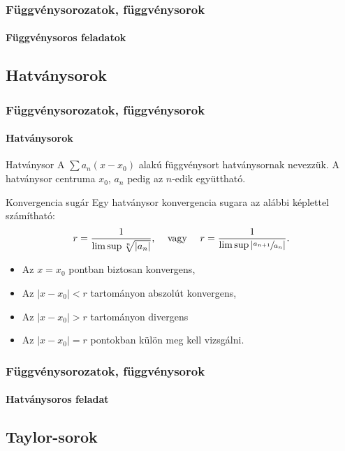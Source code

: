 \begin{frame}
  \frametitle{Függvénysorozatok, függvénysorok}
  \framesubtitle{Függvénysoros feladatok}

  
\end{frame}

\subsection{Hatványsorok}

\begin{frame}
  \frametitle{Függvénysorozatok, függvénysorok}
  \framesubtitle{Hatványsorok}

  \begin{block}{Hatványsor}
    A $\sum a_n (x - x_0)$ alakú függvénysort hatványsornak nevezzük.
    A hatványsor centruma $x_0$, $a_n$ pedig az $n$-edik együttható.
  \end{block}

  \begin{block}{Konvergencia sugár}
    Egy hatványsor konvergencia sugara az alábbi képlettel számítható:
    \[
      r = \frac{1}{\limsup \sqrt[n]{|a_n|}}
      \text,
      \quad
      \text{ vagy }
      \quad
      r = \frac{1}{\limsup{|\sfrac{a_{n+1}}{a_n}|} }
      \text.
    \]
    \begin{itemize}
      \item Az $x = x_0$ pontban biztosan konvergens,
      \item Az $|x - x_0| < r$ tartományon abszolút konvergens,
      \item Az $|x - x_0| > r$ tartományon divergens
      \item Az $|x - x_0| = r$ pontokban külön meg kell vizsgálni.
    \end{itemize}
  \end{block}
\end{frame}

\begin{frame}
  \frametitle{Függvénysorozatok, függvénysorok}
  \framesubtitle{Hatványsoros feladat}

  
\end{frame}

\subsection{Taylor-sorok}

